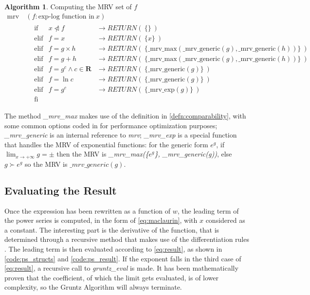 \documentclass{article}
\theoremstyle{plain}
\theoremstyle{definition}
\theoremstyle{algorithm}
\newtheorem*{algo*}{Algorithm}
\begin{document}
	\begin{algo*}
		Computing the MRV set of \(f\) \\
		\[
		\begin{aligned}
			\text{mrv}\:&(f : \text{exp-log function in} \: x) \\
			&\begin{aligned}
				&\text{if} &x \ntriangleleft f & \rightarrow RETURN(\:\{\}\:) \\
				&\text{elif} &f = x & \rightarrow RETURN(\:\{x\}\:) \\
				&\text{elif} &f = g \times h & \rightarrow RETURN(\:\{\text{\_mrv\_max}(\text{\_mrv\_generic}(g), \text{\_mrv\_generic}(h))\}\:) \\
				&\text{elif} &f = g + h & \rightarrow RETURN(\:\{\text{\_mrv\_max}(\text{\_mrv\_generic}(g), \text{\_mrv\_generic}(h))\}\:) \\
				&\text{elif} &f = g^{c} \wedge c \in \mathbf{R} & \rightarrow RETURN(\:\{\text{\_mrv\_generic}(g)\}\:) \\
				&\text{elif} &f = \ln{c} & \rightarrow RETURN(\:\{\text{\_mrv\_generic}(g)\}\:) \\
				&\text{elif} &f = g^{c} & \rightarrow RETURN(\:\{\text{\_mrv\_exp}(g)\}\:) \\
				&\text{fi}
			\end{aligned}
		\end{aligned}
		\]
	\end{algo*}

	The method \textit{\_mrv\_max} makes use of the definition in \eqref{defn:comparability}, with some common options coded in for performance optimization purposes; \textit{\_mrv\_generic} is an internal reference to \textit{mrv}; \textit{\_mrv\_exp} is a special function that handles the MRV  of exponential functions: for the generic form \(e^{g}\), if \(\lim_{x \to +\infty}{g} = \pm\) then the MRV is \textit{\_mrv\_max(\{\(e^{g}\)\}, \_mrv\_generic(g))}, else \(g \succ e^{g}\) so the MRV is \(\_mrv\_generic(g)\).
	
	\subsection{Evaluating the Result}
	
	Once the expression has been rewritten as a function of \(w\), the leading term of the power series is computed, in the form of \eqref{eq:maclaurin}, with \(x\) considered as a constant. The interesting part is the derivative of the function, that is determined through a recursive method that makes use of the differentiation rules \cite{wiki:diffrules}.
	The leading term is then evaluated according to \eqref{eq:result}, as shown in \cref{code:ps_structs} and \cref{code:ps_result}.
	If the exponent falls in the third case of \eqref{eq:result}, a recursive call to \textit{gruntz\_eval} is made. It has been mathematically proven that the coefficient, of which the limit gets evaluated, is of lower complexity, so the Gruntz Algorithm will always terminate.
	
\end{document}
